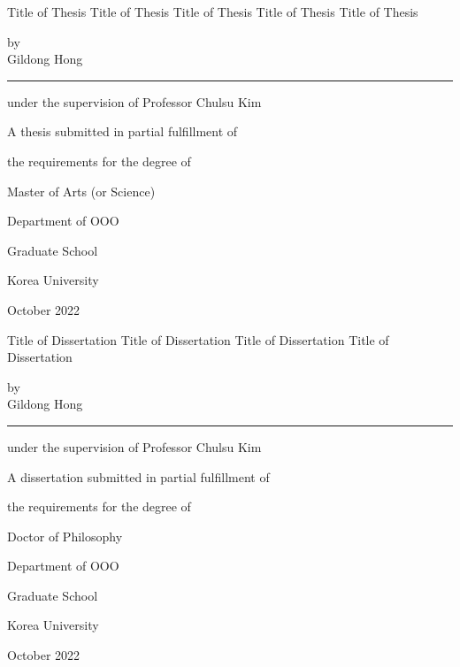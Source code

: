\documentclass[11pt]{report}
\numberwithin{figure}{section}
\theoremstyle{plain}
\theoremstyle{definition}
\theoremstyle{corollary}
\theoremstyle{definition}
\theoremstyle{plain}
\theoremstyle{definition}
\theoremstyle{plain}
\begin{document}
\newpage %
\huge Title of Thesis Title of Thesis Title of Thesis Title of Thesis Title of Thesis  
\par\vspace{3cm} %
\Large by\\
Gildong Hong
\par\vspace{1.0cm}
\rule{.6\textwidth}{0.4pt} %
\par\vspace{0.7cm}
under the supervision of Professor Chulsu Kim
\par\vspace{0.7cm}
A thesis submitted in partial fulfillment of \par
the requirements for the degree of \par
Master of Arts (or Science)  
\par\vspace{10pt}
\Large Department of OOO 
\par\vspace{1.5cm}
\LARGE Graduate School 
\par\vspace{0.5cm}
\LARGE Korea University 
\par\vspace{1cm}
\large October 2022

\newpage %
\huge Title of Dissertation Title of Dissertation Title of Dissertation Title of Dissertation  
\par\vspace{1.5cm} %
\Large by\\
Gildong Hong
\par\vspace{1.0cm}
\rule{.6\textwidth}{0.4pt} %
\par\vspace{0.7cm}
under the supervision of Professor Chulsu Kim
\par\vspace{0.7cm}
A dissertation submitted in partial fulfillment of \par
the requirements for the degree of \par
Doctor of Philosophy  
\par\vspace{10pt}
\Large Department of OOO 
\par\vspace{1.5cm}
\LARGE Graduate School 
\par\vspace{0.2cm}
\LARGE Korea University 
\par\vspace{1cm}
\large October 2022
\end{document}
